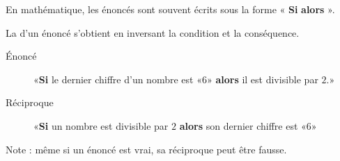 En mathématique, les énoncés sont souvent écrits sous la forme « {\bf Si}  {\bf alors} ».

\begin{definition}
    La  d'un énoncé s'obtient en inversant la condition et la conséquence.
\end{definition}

\begin{example}
    \begin{description}
        \item[Énoncé] «{\bf Si} le dernier chiffre d'un nombre est «\( 6\)» {\bf alors} il est divisible par \( 2\).» 
        \item[Réciproque] «{\bf Si} un nombre est divisible par \( 2\) {\bf alors} son dernier chiffre est «\( 6\)» 
    \end{description}
    Note : même si un énoncé est vrai, sa réciproque peut être fausse.
\end{example}
